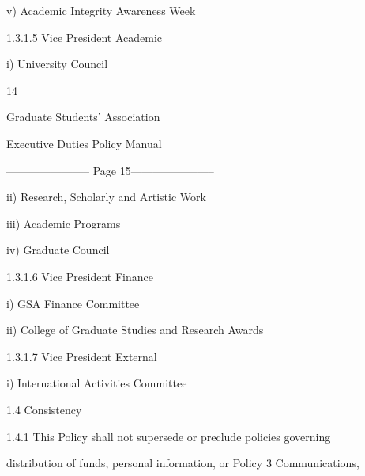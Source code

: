   

          v)        Academic Integrity Awareness Week   

  

1.3.1.5             Vice President Academic   

  

          i)        University Council   

  



                                                          14  

                                         

                                       Graduate Students’ Association  

                                      Executive Duties Policy Manual  

  


----------------------- Page 15-----------------------

           ii)        Research, Scholarly and Artistic Work   

  

           iii)       Academic Programs   

  

           iv)        Graduate Council   

  

  

  

 1.3.1.6              Vice President Finance   

  

           i)         GSA Finance Committee   

  

           ii)        College of Graduate Studies and Research Awards   

  

 1.3.1.7              Vice President External   

  

           i)         International Activities Committee   

                               

                             1.4        Consistency  

  

 1.4.1                This Policy  shall not supersede or preclude policies governing  

distribution  of  funds,  personal  information,  or  Policy  3  Communications,  

